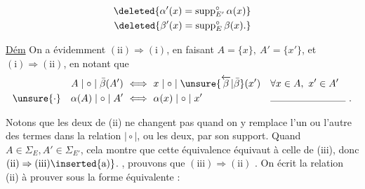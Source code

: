 
\[
\begin{aligned}
\deleted{\alpha'(x)=\operatorname{supp}^{\circ}_{E'}\alpha(x)}\\
\deleted{\beta'(x)=\operatorname{supp}^{\circ}_E\beta(x).}
\end{aligned}
\]


\uline{Dém} On a évidemment $(\mathrm{ii})\Rightarrow(\mathrm{i})$, en faisant $A=\{x\},\ A'=\{x'\}$, et $(\mathrm{i})\Rightarrow(\mathrm{ii})$, en notant que
\[
\begin{aligned}
A\mid\circ\mid\bar\beta(A')&\ \Longleftrightarrow\ x\mid\circ\mid\unsure{\overleftarrow\beta|\bar\beta}(x') &&\forall x\in A,\ x'\in A'\\
\unsure{\cdot}\quad\alpha(A)\mid\circ\mid A'&\ \Longleftrightarrow\ \alpha(x)\mid\circ\mid x' &&\rule{2.7cm}{0.3pt}\ .
\end{aligned}
\]

Notons que les deux  de (ii) ne changent pas quand on y remplace l'un ou l'autre des termes dans la relation $\mid\circ\mid$, ou les deux, par son support. Quand $A\in\Sigma_E,A'\in\Sigma_{E'}$, cela montre que cette équivalence  équivaut à celle de (iii), donc $(\mathrm{ii})\Rightarrow(\mathrm{iii})\inserted{\text{a)}}$.  , prouvons que $(\mathrm{iii})\Rightarrow(\mathrm{ii})$ . On écrit la relation (ii) à prouver sous la forme équivalente :
